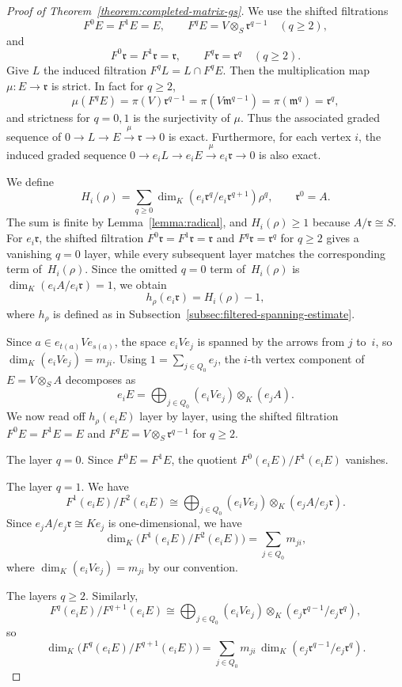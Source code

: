 \documentclass[10pt,a4paper]{amsart}
\newcommand{\m}{\mathfrak m}
\newcommand{\rA}{\mathfrak r}
\begin{document}
	\begin{proof}[Proof of Theorem~\ref{theorem:completed-matrix-gs}]
		We use the shifted filtrations
		\[
		F^0E=F^1E=E,
		\qquad
		F^qE=V\otimes_S\rA^{q-1}\quad(q\geq2),
		\]
		and
		\[
		F^0\rA=F^1\rA=\rA,
		\qquad
		F^q\rA=\rA^q\quad(q\geq2).
		\]
		Give $L$ the induced filtration $F^qL=L\cap F^qE$.  Then the multiplication map
		$\mu:E\to\rA$ is strict.  In fact for $q\geq2$,
		\[
		\mu(F^qE)=\pi(V)\rA^{q-1}
		=\pi(V\m^{q-1})=\pi(\m^q)=\rA^q,
		\]
		and strictness for $q=0,1$ is the surjectivity of $\mu$.  Thus the
		associated graded sequence of
		$0\to L\to E\overset{\mu}{\to}\rA\to0$ is exact.
		Furthermore, for each vertex $i$, the induced graded sequence 
$0\to e_iL\to e_iE\overset{\mu}{\to}e_i\rA\to0$ is also exact.

We define
\[
H_i(\rho)=\sum_{q\geq0}
\dim_K(e_i\rA^q/e_i\rA^{q+1})\rho^q,
\qquad \rA^0=A.
\]
The sum is finite by Lemma~\ref{lemma:radical}, and $H_i(\rho)\geq1$
because $A/\rA\cong S$. For $e_i\rA$, the shifted filtration
$F^0\rA=F^1\rA=\rA$ and $F^q\rA=\rA^q$ for $q\geq2$ gives a vanishing
$q=0$ layer, while every subsequent layer matches the corresponding
term of~$H_i(\rho)$.  Since the omitted $q=0$ term of~$H_i(\rho)$ is
$\dim_K(e_iA/e_i\rA)=1$, we obtain
\[h_\rho(e_i\rA)=H_i(\rho)-1,
\]
where $h_\rho$ is defined as in
Subsection~\ref{subsec:filtered-spanning-estimate}.

Since $a\in e_{t(a)}Ve_{s(a)}$, the space $e_iVe_j$ is spanned by the
arrows from $j$ to~$i$, so $\dim_K(e_iVe_j)=m_{ji}$.
Using $1=\sum_{j\in Q_0}e_j$, the $i$-th vertex component of
$E=V\otimes_SA$ decomposes as
\[
 e_iE=\bigoplus_{j\in Q_0}(e_iVe_j)\otimes_K(e_jA).
\]
We now read off $h_\rho(e_iE)$ layer by layer, using the shifted
filtration $F^0E=F^1E=E$ and $F^qE=V\otimes_S\rA^{q-1}$ for $q\geq2$.

The layer $q=0$.
Since $F^0E=F^1E$, the quotient $F^0(e_iE)/F^1(e_iE)$ vanishes.

The layer $q=1$.
We have
\[
 F^1(e_iE)/F^2(e_iE)
 \cong\bigoplus_{j\in Q_0}(e_iVe_j)\otimes_K(e_jA/e_j\rA).
\]
Since 
$e_jA/e_j\rA\cong Ke_j$ is one-dimensional, we have
\[
 \dim_K\bigl(F^1(e_iE)/F^2(e_iE)\bigr)=\sum_{j\in Q_0}m_{ji},
\]
where $\dim_K(e_iVe_j)=m_{ji}$ by our convention.

The layers $q\geq2$.
Similarly,
\[
 F^q(e_iE)/F^{q+1}(e_iE)
 \cong\bigoplus_{j\in Q_0}(e_iVe_j)\otimes_K
       (e_j\rA^{q-1}/e_j\rA^q),
\]
so
\[
 \dim_K\bigl(F^q(e_iE)/F^{q+1}(e_iE)\bigr)
 =\sum_{j\in Q_0}m_{ji}\,
   \dim_K(e_j\rA^{q-1}/e_j\rA^q).
\]


\end{proof}
\end{document}
